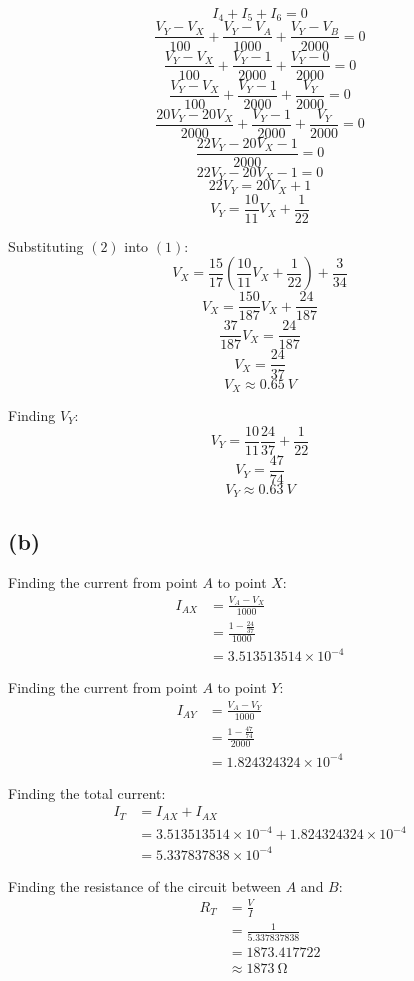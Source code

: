 \documentclass[11pt]{article}
\begin{document}
\newpage

\[I_4 + I_5 + I_6 = 0\]
\[\frac{V_Y - V_X}{100} + \frac{V_Y - V_A}{1000} + \frac{V_Y - V_B}{2000} = 0\]
\[\frac{V_Y - V_X}{100} + \frac{V_Y - 1}{2000} + \frac{V_Y - 0}{2000} = 0\]
\[\frac{V_Y - V_X}{100} + \frac{V_Y - 1}{2000} + \frac{V_Y}{2000} = 0\]
\[\frac{20V_Y - 20V_X}{2000} + \frac{V_Y - 1}{2000} + \frac{V_Y}{2000} = 0\]
\[\frac{22V_Y - 20V_X - 1}{2000} = 0\]
\[22V_Y - 20V_X - 1 = 0\]
\[22V_Y = 20V_X + 1\]
\[V_Y = \frac{10}{11} V_X + \frac{1}{22} \tag{2}\]

Substituting \((2)\) into \((1)\):
\[V_X = \frac{15}{17} \left( \frac{10}{11} V_X + \frac{1}{22} \right) + \frac{3}{34}\]
\[V_X = \frac{150}{187}V_X + \frac{24}{187}\]
\[\frac{37}{187}V_X = \frac{24}{187}\]
\[V_X = \frac{24}{37}\]
\[V_X \approx \qty{0.65}{\unit{V}} \tag{3}\]

Finding \(V_Y\):
\[V_Y = \frac{10}{11} \frac{24}{37} + \frac{1}{22}\]
\[V_Y = \frac{47}{74}\]
\[V_Y \approx \qty{0.63}{\unit{V}}\]
\subsection{(b)}
\label{sec:org222e7e8}
Finding the current from point \(A\) to point \(X\):
\begin{align*}
I_{AX} &= \frac{V_A - V_X}{1000} \\
&= \frac{1 - \frac{24}{37}}{1000} \\
&= 3.513513514 \times 10^{-4}
\end{align*}

Finding the current from point \(A\) to point \(Y\):
\begin{align*}
I_{AY} &= \frac{V_A - V_Y}{1000} \\
&= \frac{1 - \frac{47}{74}}{2000} \\
&= 1.824324324 \times 10^{-4}
\end{align*}

Finding the total current:
\begin{align*}
I_{T} &= I_{AX} + I_{AX} \\
&= 3.513513514 \times 10^{-4} + 1.824324324 \times 10^{-4} \\
&= 5.337837838 \times 10^{-4}
\end{align*}

Finding the resistance of the circuit between \(A\) and \(B\):
\begin{align*}
R_{T} &= \frac{V}{I} \\
&= \frac{1}{5.337837838} \\
&= 1873.417722 \\
&\approx \qty{1873}{\unit{\ohm}}
\end{align*}
\end{document}
